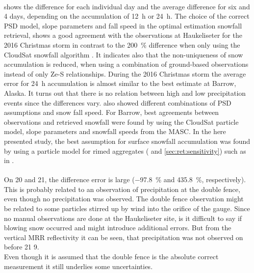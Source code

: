 \\
 shows the difference for each individual day and the average difference for six and 4 days, depending on the accumulation of \SI{12}{\hour} or \SI{24}{\hour}.
The choice of the correct PSD model, slope parameters and fall speed in the optimal estimation snowfall retrieval, shows a good agreement with the observations at Haukeliseter for the 2016 Christmas storm in contrast to the \SI{200}{\percent} difference when only using the CloudSat snowfall algorithm . It indicates also that the non-uniqueness of snow accumulation is reduced, when using a combination of ground-based observations instead of only Ze-S relationships. 
During the 2016 Christmas storm the average error for \SI{24}{\hour} accumulation is almost similar to the best estimate at Barrow, Alaska. It turns out that there is no relation between high and low precipitation events since the differences vary. \citet{cooper_variational_2017} also showed different combinations of PSD assumptions and snow fall speed. For Barrow, best agreements between observations and retrieved snowfall were found by using the CloudSat particle model, slope parameters and snowfall speeds from the MASC. In the here presented study, the best assumption for surface snowfall accumulation was found by using a particle model for rimed aggregates ( and \ref{sec:ret:sensitivity}) such as in . 
\\
\\
On \num{20} and \SI{21}{\dec}, the difference error is large (\SI{-97.8}{\percent} and \SI{435.8}{\percent}, respectively). This is probably related to an observation of precipitation at the double fence, even though no precipitation was observed. The double fence observation might be related to some particles stirred up by wind into the orifice of the gauge. Since no manual observations are done at the Haukeliseter site, is it difficult to say if blowing snow occurred and might introduce additional errors. But from the vertical MRR reflectivity it can be seen, that precipitation was not observed on before \SI{21}{\dec} \SI{9}{\UTC}.
\\
Even though it is assumed that the double fence is the absolute correct measurement it still underlies some uncertainties. 
